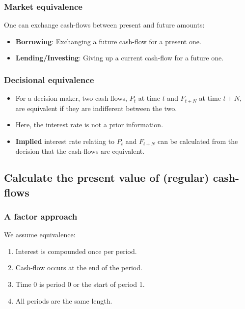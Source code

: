     \subsubsection{Market equivalence}
    \begin{definition}
        One can exchange cash-flows between present and future amounts:
        \begin{itemize}
            \item \textbf{Borrowing}: Exchanging a future cash-flow for a present one.
            \item \textbf{Lending/Investing}: Giving up a current cash-flow for a future one.
        \end{itemize}
        
    \end{definition}

    \subsubsection{Decisional equivalence}
    \begin{definition}
        \begin{itemize}
            \item For a decision maker, two cash-flows, \( P_t \) at time \( t \) and \( F_{t+N} \) at time \( t+N \), are equivalent if they are indifferent between the two.
            \item Here, the interest rate is not a prior information.
            \item \textbf{Implied} interest rate relating to \( P_t \) and \( F_{t+N} \) can be calculated from the decision that the cash-flows are equivalent.
        \end{itemize}
    \end{definition}

\subsection{Calculate the present value of (regular) cash-flows}
    \subsubsection{A factor approach}
    \begin{definition}
        We assume equivalence:
        \begin{enumerate}
            \item Interest is compounded once per period.
            \item Cash-flow occurs at the end of the period.
            \item Time 0 is period 0 or the start of period 1.
            \item All periods are the same length.
        \end{enumerate}
    \end{definition}

